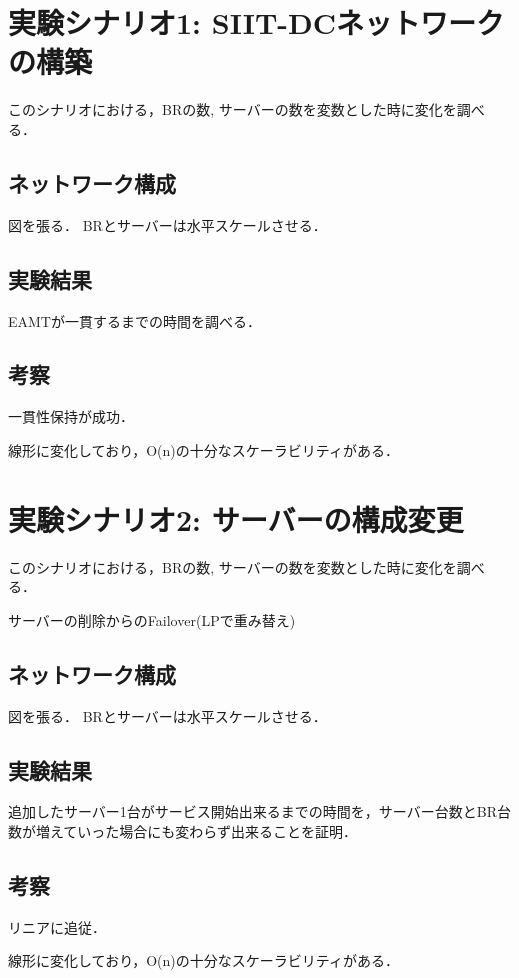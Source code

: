 \section{実験シナリオ1: SIIT-DCネットワークの構築}
このシナリオにおける，BRの数, サーバーの数を変数とした時に変化を調べる．

\subsection{ネットワーク構成}
図を張る． BRとサーバーは水平スケールさせる．


\subsection{実験結果}
EAMTが一貫するまでの時間を調べる．

\subsection{考察}
一貫性保持が成功．

線形に変化しており，O(n)の十分なスケーラビリティがある．


\section{実験シナリオ2: サーバーの構成変更}
このシナリオにおける，BRの数, サーバーの数を変数とした時に変化を調べる．

サーバーの削除からのFailover(LPで重み替え)



\subsection{ネットワーク構成}
図を張る． BRとサーバーは水平スケールさせる．

\subsection{実験結果}
追加したサーバー1台がサービス開始出来るまでの時間を，サーバー台数とBR台数が増えていった場合にも変わらず出来ることを証明．


\subsection{考察}
リニアに追従．

線形に変化しており，O(n)の十分なスケーラビリティがある．


